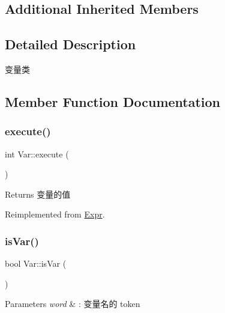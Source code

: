 \subsection*{Additional Inherited Members}


\subsection{Detailed Description}
变量类 

\subsection{Member Function Documentation}
\mbox{\label{class_var_a9dc96e803f7b0f9aa519c2c0e0a6bd8f}} 
\subsubsection{\texorpdfstring{execute()}{execute()}}
{\footnotesize\ttfamily int Var\+::execute (\begin{DoxyParamCaption}{ }\end{DoxyParamCaption})\hspace{0.3cm}{\ttfamily [virtual]}}

\begin{DoxyReturn}{Returns}
变量的值 
\end{DoxyReturn}


Reimplemented from \hyperlink{class_expr_aff6a2e6eaa460e2a3db28ebdab089b51}{Expr}.

\mbox{\label{class_var_a50aa6f54310903a8bc36184813a2b9ef}} 
\subsubsection{\texorpdfstring{is\+Var()}{isVar()}}
{\footnotesize\ttfamily bool Var\+::is\+Var (\begin{DoxyParamCaption}{ }\end{DoxyParamCaption})\hspace{0.3cm}{\ttfamily [virtual]}}


\begin{DoxyParams}{Parameters}
{\em word} & \+: 变量名的 token \\
\hline
\end{DoxyParams}



